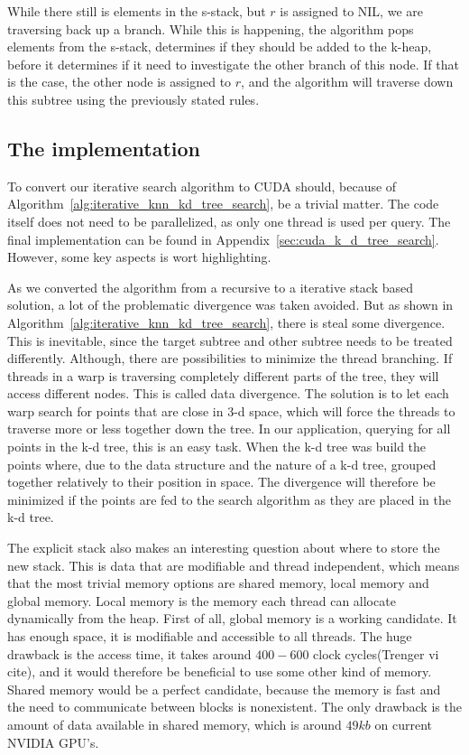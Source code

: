 While there still is elements in the s-stack, but $r$ is assigned to NIL, we are traversing back up a branch. While this is happening, the algorithm pops elements from the s-stack, determines if they should be added to the k-heap, before it determines if it need to investigate the other branch of this node. If that is the case, the other node is assigned to $r$, and the algorithm will traverse down this subtree using the previously stated rules.



\subsection{The implementation} %
\label{sub:the_implementation}

To convert our iterative search algorithm to CUDA should, because of Algorithm~\ref{alg:iterative_knn_kd_tree_search}, be a trivial matter. The code itself does not need to be parallelized, as only one thread is used per query. The final implementation can be found in Appendix~\ref{sec:cuda_k_d_tree_search}. However, some key aspects is wort highlighting.


As we converted the algorithm from a recursive to a iterative stack based solution, a lot of the problematic divergence was taken avoided. But as shown in Algorithm~\ref{alg:iterative_knn_kd_tree_search}, there is steal some divergence. This is inevitable, since the target subtree and other subtree needs to be treated differently. Although, there are possibilities to minimize the thread branching. If threads in a warp is traversing completely different parts of the tree, they will access different nodes. This is called data divergence. The solution is to let each warp search for points that are close in 3-d space, which will force the threads to traverse more or less together down the tree. In our application, querying for all points in the k-d tree, this is an easy task. When the k-d tree was build the points where, due to the data structure and the nature of a k-d tree, grouped together relatively to their position in space. The divergence will therefore be minimized if the points are fed to the search algorithm as they are placed in the k-d tree.


The explicit stack also makes an interesting question about where to store the new stack. This is data that are modifiable and thread independent, which means that the most trivial memory options are shared memory, local memory and global memory. Local memory is the memory each thread can allocate dynamically from the heap. First of all, global memory is a working candidate. It has enough space, it is modifiable and accessible to all threads. The huge drawback is the access time, it takes around $400-600$ clock cycles(Trenger vi cite), and it would therefore be beneficial to use some other kind of memory. Shared memory would be a perfect candidate, because the memory is fast and the need to communicate between blocks is nonexistent. The only drawback is the amount of data available in shared memory, which is around $49 kb$ on current NVIDIA GPU's. 

